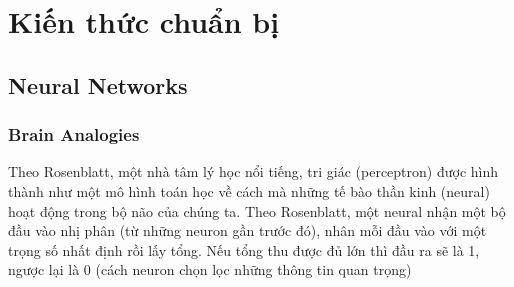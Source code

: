 

\newcommand{\ba}{\mathbf{a}}
\newcommand{\bb}{\mathbf{b}}
\newcommand{\bw}{\mathbf{w}}
\newcommand{\bx}{\mathbf{x}}
\newcommand{\by}{\mathbf{y}}
\newcommand{\Exp}[2]{\mathbb{E}_{#1}\left[#2\right]}
\newcommand{\Var}[2]{\text{Var}_{#1}\left[#2\right]}
\newcommand{\Cov}[2]{\text{Cov}_{#1}\left[#2\right]}
\newcommand{\Corr}[2]{\text{Corr}_{#1}\left[#2\right]}

\newcommand{\bA}{\mathbf{A}}
\newcommand{\bB}{\mathbf{B}}
\newcommand{\bV}{\mathbf{V}}
\newcommand{\bW}{\mathbf{W}}
\newcommand{\bv}{\mathbf{v}}

\newcommand{\bphi}{\mathbf{\phi}}
\newcommand{\bt}{\mathbf{\theta}}
\newcommand{\bdelta}{\mathbf{\delta}}
\newcommand{\beps}{\mathbf{\epsilon}}
\newcommand{\q}{q_\mathbf{\phi}}
\newcommand{\bmu}{\mathbf{\mu}}
\newcommand{\bsigma}{\mathbf{\sigma}}
\newcommand{\bSigma}{\mathbf{\Sigma}}

\newcommand{\D}{\mathcal{D}}

\newcommand{\eqnr}{\addtocounter{equation}{1}\tag{\theequation}}

\chapter{Kiến thức chuẩn bị}

\ifpdf
\graphicspath{{Chapter2/Figs/Raster/}{Chapter2/Figs/PDF/}{Chapter2/Figs/}}
\else
\graphicspath{{Chapter2/Figs/Vector/}{Chapter2/Figs/}}
\fi


\pagebreak

\section{Neural Networks}
\subsection{Brain Analogies}

Theo Rosenblatt, một nhà tâm lý học nổi tiếng, tri giác (perceptron) được hình thành như một mô hình toán học về cách mà những tế bào thần kinh (neural) hoạt động trong bộ não của chúng ta. Theo Rosenblatt, một neural nhận một bộ đầu vào nhị phân (từ những neuron gần trước đó), nhân mỗi đầu vào với một trọng số nhất định rồi lấy tổng. Nếu tổng thu được đủ lớn thì đầu ra sẽ là 1, ngược lại là 0 (cách neuron chọn lọc những thông tin quan trọng)

